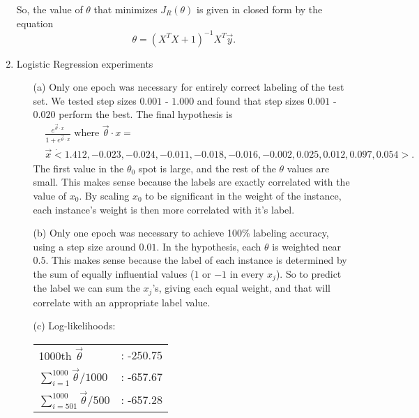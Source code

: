 \documentclass[12pt]{article}
\begin{document}
\begin{enumerate}
  So, the value of $\theta$ that minimizes $J_R(\theta)$ is given in closed form by the equation \[\theta =  (X^TX + 1)^{-1}X^T\vec{y}.\]
  
	\item Logistic Regression experiments
	
	\begin{enumerate}
	\item[(a)] Only one epoch was necessary for entirely correct labeling of the test set. We tested step sizes $0.001$ - $1.000$ and found that step sizes $0.001$ - $0.020$ perform the best. The final hypothesis is
	\begin{align*}
	 &\frac{e^{\vec{\theta} \cdot x}}{1 + e^{\vec{\theta} \cdot x}} \text{ where } \vec{\theta} \cdot x = \\
	  & \vec{x} \dot < 1.412, -0.023, -0.024, -0.011, -0.018, -0.016, -0.002, 0.025, 0.012, 0.097, 0.054 >.
	\end{align*}
	The first value in the $\theta_0$ spot is large, and the rest of the $\theta$ values are small. This makes sense because the labels are exactly correlated with the value of $x_0$. By scaling $x_0$ to be significant in the weight of the instance, each instance's weight is then more correlated with it's label. 
	
	\item[(b)] Only one epoch was necessary to achieve 100\% labeling accuracy, using a step size around $0.01$. In the hypothesis, each $\theta$ is weighted near $0.5$. This makes sense because the label of each instance is determined by the sum of equally influential values ($1$ or $-1$ in every $x_j$). So to predict the label we can sum the $x_j$'s, giving each equal weight, and that will correlate with an appropriate label value.
	
	\item[(c)] Log-likelihoods: \\
	\begin{tabular}{l l}
		1000th $\vec{\theta}$ &: -250.75  \\
		$\sum_{i=1}^{1000} \vec{\theta} / 1000 $ &: -657.67 \\
		$\sum_{i=501}^{1000} \vec{\theta} / 500 $ &: -657.28  \\
	\end{tabular} 
	\end{enumerate}
  
\end{enumerate}
\end{document}
